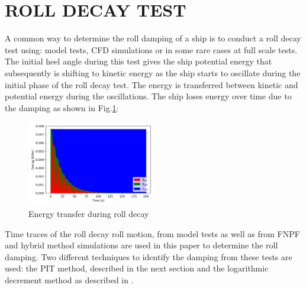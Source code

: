 \section*{ROLL DECAY TEST}\label{roll-decay-test}
A common way to determine the roll damping of a ship is to conduct a
roll decay test using: model tests, CFD simulations or in some rare
cases at full scale tests. The initial heel angle during this test gives
the ship potential energy that subsequently is shifting to kinetic
energy as the ship starts to oscillate during the initial phase of the
roll decay test. The energy is transferred between kinetic and potential
energy during the oscillations. The ship loses energy over time due to
the damping as shown in Fig.\ref{fig:energy}:
\begin{figure}[H]
\begin{center}\includegraphics[width = 0.5\textwidth]{figures/energy.png}\end{center}
\vspace{-1cm}
\caption{Energy transfer during roll decay}
\label{fig:energy}
\end{figure}
Time traces of the roll decay roll motion, from model tests as well as
from FNPF and hybrid method simulations are used in this paper to
determine the roll damping. Two different techniques to identify the
damping from these tests are used: the PIT method, described in the next
section and the logarithmic decrement method as described in
\citep{7505983/BYNJ8CFG}.
